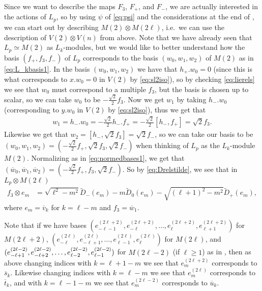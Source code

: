 Since we want to describe the maps $F_3$, $F_+$, and $F_-$, we are actually interested in the actions of $L_p$, so by using $\psi$ of \cref{eq:psi} and the considerations at the end of , we can start out by describing $M(2)\otimes M(2\ell)$, i.e.\ we can use the description of $V(2)\otimes V(n)$ from above. Note that we have already seen that $L_p\simeq M(2)$ as $L_k$-modules, but we would like to better understand how the basis $(f_+,f_3,f_-)$ of $L_p$ corresponds to the basis $(w_0,w_1,w_2)$ of $M(2)$ as in \cref{eq:L_kbasis1}. In the basis $(w_0,w_1,w_2)$ we have that $h_+ . w_0 = 0$ (since this is what corresponds to $x.w_0=0$ in $V(2)$ by \cref{eq:sl2iso}), so by checking \cref{eq:lierels} we see that $w_0$ must correspond to a multiple $f_3$, but the basis is chosen up to scalar, so we can take $w_0$ to be $-\tfrac{\sqrt{2}}{2}f_3$. Now we get $w_1$ by taking $h_- . w_0$ (corresponding to $y.w_0$ in $V(2)$ by \cref{eq:sl2iso}), thus we get that
\begin{align*}
  w_1 = h_-.w_0 = -\tfrac{\sqrt{2}}{2}h_- . f_+ = -\tfrac{\sqrt{2}}{2}[h_-,f_+] = \sqrt{2}f_3.
\end{align*}
Likewise we get that $w_2=[h_-,\sqrt{2}f_3]=\sqrt{2}f_-$, so we can take our basis to be $(w_0,w_1,w_2)=(-\tfrac{\sqrt{2}}{2}f_+,\sqrt{2}f_3,\sqrt{2}f_-)$ when thinking of $L_p$ as the $L_k$-module $M(2)$. Normalizing as in \cref{eq:normedbases1}, we get that $(\overline w_0,\overline w_1,\overline w_2)=(-\tfrac{\sqrt{2}}{2}f_+,f_3,\sqrt{2}f_-)$. So by \cref{eq:Drelstilde}, we see that in $L_p\otimes M(2\ell)$
\begin{align*}
  f_3 \otimes e_m &= \sqrt{\ell^2-m^2}\widetilde D_-(e_m) - m\widetilde D_0(e_m) - \sqrt{(\ell+1)^2-m^2}\widetilde D_+(e_m),
\end{align*}
where $e_m=\overline v_k$ for $k=\ell-m$ and $f_3 = \overline w_1$.
\begin{remark}\label{rem:baseswithindexchange}
  Note that if we have bases $(e_{-\ell-1}^{(2\ell+2)},e_{-\ell}^{(2\ell+2)},\dotsc,e_{\ell}^{(2\ell+2)},e_{\ell+1}^{(2\ell+2)})$ for $M(2\ell+2)$, $(e_{-\ell}^{(2\ell)},e_{-\ell+1}^{(2\ell)},\dotsc,e_{\ell-1}^{(2\ell)},e_{\ell}^{(2\ell)})$ for $M(2\ell)$, and $(e_{-\ell+1}^{(2\ell-2)},e_{-\ell+2}^{(2\ell-2)},\dotsc,\\ e_{\ell-2}^{(2\ell-2)},e_{\ell-1}^{(2\ell-2)})$ for $M(2\ell-2)$ (if $\ell\geq 1$) as in , then as above changing indices with $k=\ell+1-m$ we see that $e_m^{(2\ell+2)}$ corresponds to $\overline s_k$. Likewise changing indices with $k=\ell-m$ we see that $e_m^{(2\ell)}$ corresponds to $\overline t_k$, and with $k=\ell-1-m$ we see that $e_m^{(2\ell-2)}$ corresponds to $\overline u_k$. 
\end{remark}

